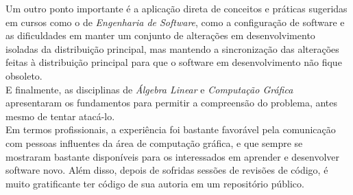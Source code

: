 Um outro ponto importante é a aplicação direta de conceitos e práticas sugeridas em cursos como o de \emph{Engenharia de Software}, como a configuração de software e as dificuldades em manter um conjunto de alterações em desenvolvimento isoladas da distribuição principal, mas mantendo a sincronização das alterações feitas à distribuição principal para que o software em desenvolvimento não fique obsoleto. \\

E finalmente, as disciplinas de \emph{Álgebra Linear} e \emph{Computação Gráfica} apresentaram os fundamentos para permitir a compreensão do problema, antes mesmo de tentar atacá-lo. \\

Em termos profissionais, a experiência foi bastante favorável pela comunicação com pessoas influentes da área de computação gráfica, e que sempre se mostraram bastante disponíveis para os interessados em aprender e desenvolver software novo. Além disso, depois de sofridas sessões de revisões de código, é muito gratificante ter código de sua autoria em um repositório público.